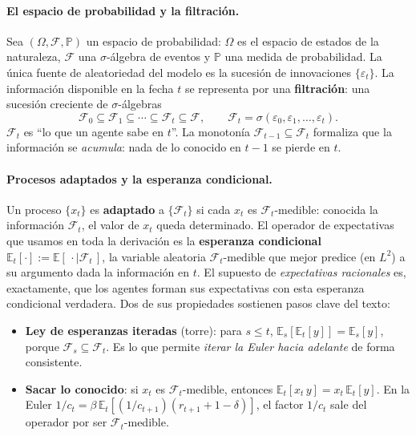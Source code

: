 \documentclass[11pt,a4paper]{report}
\newcommand{\E}{\mathbb{E}}
\begin{document}
\paragraph{El espacio de probabilidad y la filtración.} Sea $(\Omega,\mathcal{F},
\mathbb{P})$ un espacio de probabilidad: $\Omega$ es el espacio de estados de la
naturaleza, $\mathcal{F}$ una $\sigma$-álgebra de eventos y $\mathbb{P}$ una medida de
probabilidad. La única fuente de aleatoriedad del modelo es la sucesión de
innovaciones $\{\varepsilon_t\}$. La información disponible en la fecha $t$ se
representa por una \textbf{filtración}: una sucesión creciente de $\sigma$-álgebras
\begin{equation}
\mathcal{F}_0\subseteq\mathcal{F}_1\subseteq\cdots\subseteq\mathcal{F}_t\subseteq
\mathcal{F},\qquad \mathcal{F}_t=\sigma(\varepsilon_0,\varepsilon_1,\dots,
\varepsilon_t).
\label{eq:filtration}
\end{equation}
$\mathcal{F}_t$ es ``lo que un agente sabe en $t$''. La monotonía
$\mathcal{F}_{t-1}\subseteq\mathcal{F}_t$ formaliza que la información se
\emph{acumula}: nada de lo conocido en $t-1$ se pierde en $t$.

\paragraph{Procesos adaptados y la esperanza condicional.} Un proceso $\{x_t\}$ es
\textbf{adaptado} a $\{\mathcal{F}_t\}$ si cada $x_t$ es $\mathcal{F}_t$-medible:
conocida la información $\mathcal{F}_t$, el valor de $x_t$ queda determinado. El
operador de expectativas que usamos en toda la derivación es la \textbf{esperanza
condicional} $\E_t[\cdot]:=\E[\,\cdot\mid\mathcal{F}_t\,]$, la variable aleatoria
$\mathcal{F}_t$-medible que mejor predice (en $L^2$) a su argumento dada la
información en $t$. El supuesto de \emph{expectativas racionales} es, exactamente, que
los agentes forman sus expectativas con esta esperanza condicional verdadera. Dos de
sus propiedades sostienen pasos clave del texto:
\begin{itemize}[leftmargin=1.4em, topsep=2pt, itemsep=3pt]
\item \textbf{Ley de esperanzas iteradas} (torre): para $s\le t$,
  $\E_s[\E_t[y]]=\E_s[y]$, porque $\mathcal{F}_s\subseteq\mathcal{F}_t$. Es lo que
  permite \emph{iterar la Euler hacia adelante} de forma consistente.
\item \textbf{Sacar lo conocido}: si $x_t$ es $\mathcal{F}_t$-medible, entonces
  $\E_t[x_t\,y]=x_t\,\E_t[y]$. En la Euler $1/c_t=\beta\,\E_t[(1/c_{t+1})(r_{t+1}+
  1-\delta)]$, el factor $1/c_t$ sale del operador por ser $\mathcal{F}_t$-medible.
\end{itemize}
\end{document}
